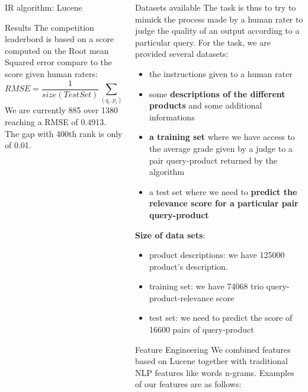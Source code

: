 \documentclass{beamer}
\newlength\postercolumnwidth
\newlength\totalwidth
\begin{document}
\begin{frame}[t]{}
\begin{columns}[totalwidth=\totalwidth]
\begin{column}[t]{\postercolumnwidth}
\begin{block}{IR algorithm: Lucene}
    \end{block}
\begin{block}{Results}
\small
      The competition leaderbord is based on a score computed on the Root mean Squared error compare to the score given human raters:
\begin{equation}
RMSE=\frac{1}{size(TestSet)} \sum_{(q_{i},p_{i})} (scorePredicted(q_{i},p_{i})-TrueHumanScore(q_{i},p_{i}))^{2}
\end{equation}
We are currently 885 over 1380 reaching a RMSE of 0.4913. The gap with 400th rank is only of 0.01.
    \end{block}
\end{column} 
    
  \begin{column}[t]{\postercolumnwidth}
    \centering
\begin{block}{Datasets available}
\small
The task is thus to try to mimick the process made by a human rater to judge the quality of an output according to a particular query. For the task, we are provided several datasets: 
\begin{itemize}
\item the instructions given to a human rater 
\item some \textbf{descriptions of the different products} and some additional informations
\item\textbf{a training set} where we have access to the average grade given by a judge to a pair query-product returned by the algorithm
\item a test set where we need to \textbf{predict the relevance score for a particular pair query-product}
\end{itemize}
\textbf{Size of data sets}:
\begin{itemize}
\item product descriptions: we have 125000 product's description. 
\item training set: we have 74068 trio query-product-relevance score
\item test set: we need to predict the score of 16600 pairs of query-product
\end{itemize}     


    \end{block}
% 
 \begin{block}{Feature Engineering}
\small
We combined features based on Lucene together with traditional NLP features like words n-grams. Examples of our features are as follows:


\end{block}
\end{column}
\end{columns}
\end{frame}
\end{document}
